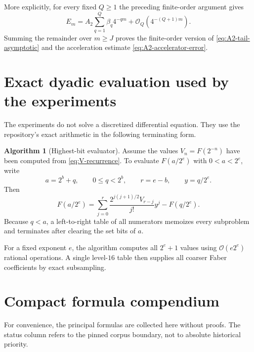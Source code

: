 \documentclass[11pt,oneside]{article}
\theoremstyle{definition}
\newtheorem{algorithm}[theorem]{Algorithm}
\theoremstyle{remark}
\newcommand{\bigO}{\mathcal O}
\newcommand{\1}{\mathbf 1}
\begin{document}
More explicitly, for every fixed $Q\ge1$ the preceding finite-order
argument gives
\begin{equation}
 E_m=A_2\sum_{q=1}^{Q}\beta_q4^{-qm}
 +\bigO_Q(4^{-(Q+1)m}).                                  \label{eq:Em-finite-asymptotic}
\end{equation}
Summing the remainder over $m\ge J$ proves the finite-order version of
\eqref{eq:A2-tail-asymptotic} and the acceleration estimate
\eqref{eq:A2-accelerator-error}.

\section{Exact dyadic evaluation used by the experiments}
\label{app:dyadic-algorithm}

The experiments do not solve a discretized differential equation.  They use
the repository's exact arithmetic in the following terminating form.

\begin{algorithm}[Highest-bit evaluator]
\label{alg:highest-bit}
Assume the values $V_n=F(2^{-n})$ have been computed from
\eqref{eq:V-recurrence}.  To evaluate $F(a/2^e)$ with
$0<a<2^e$, write
\begin{equation}
 a=2^b+q,
 \qquad 0\le q<2^b,
 \qquad r=e-b,
 \qquad y=q/2^e.                                        \label{eq:bit-decomposition}
\end{equation}
Then
\begin{equation}
 \boxed{\displaystyle
 F(a/2^e)=
 \sum_{j=0}^{r}
 \frac{2^{j(j+1)/2}V_{r-j}}{j!}y^j-F(q/2^e).}           \label{eq:highest-bit-evaluator}
\end{equation}
Because $q<a$, a left-to-right table of all numerators memoizes every
subproblem and terminates after clearing the set bits of $a$.
\end{algorithm}

For a fixed exponent $e$, the algorithm computes all $2^e+1$ values using
$\bigO(e2^e)$ rational operations.  A single level-$16$ table then supplies
all coarser Faber coefficients by exact subsampling.

\section{Compact formula compendium}
\label{app:compendium}

For convenience, the principal formulas are collected here without proofs.
The status column refers to the pinned corpus boundary, not to absolute
historical priority.
\end{document}
